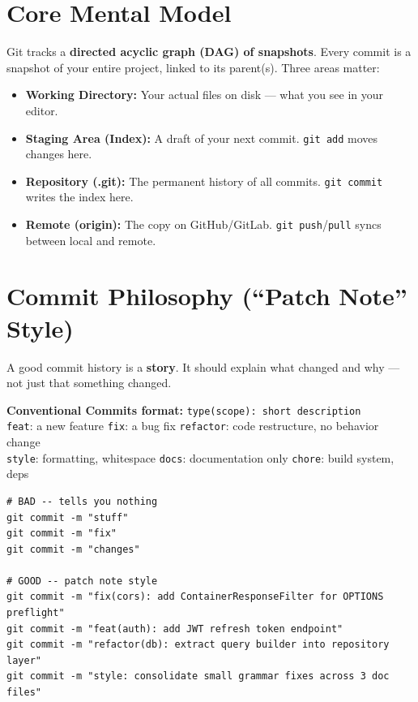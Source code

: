 \documentclass[11pt, letterpaper]{article}
\begin{document}
\vspace{8pt}

\section*{Core Mental Model}

Git tracks a \textbf{directed acyclic graph (DAG) of snapshots}. Every commit is a snapshot of your entire project, linked to its parent(s). Three areas matter:

\begin{itemize}[noitemsep]
  \item \textbf{Working Directory:} Your actual files on disk --- what you see in your editor.
  \item \textbf{Staging Area (Index):} A draft of your next commit. \texttt{git add} moves changes here.
  \item \textbf{Repository (.git):} The permanent history of all commits. \texttt{git commit} writes the index here.
  \item \textbf{Remote (origin):} The copy on GitHub/GitLab. \texttt{git push}/\texttt{pull} syncs between local and remote.
\end{itemize}

\section*{Commit Philosophy (``Patch Note'' Style)}

A good commit history is a \textbf{story}. It should explain what changed and why --- not just that something changed.

\begin{tcolorbox}[colback=part7bg, colframe=sectiongrey, arc=3pt, boxrule=1pt]
\textbf{Conventional Commits format:} \quad \texttt{type(scope): short description}\\[4pt]
\texttt{feat}: a new feature \quad
\texttt{fix}: a bug fix \quad
\texttt{refactor}: code restructure, no behavior change\\
\texttt{style}: formatting, whitespace \quad
\texttt{docs}: documentation only \quad
\texttt{chore}: build system, deps
\end{tcolorbox}

\begin{lstlisting}[style=gitlog, caption={Good vs.\ bad commits}]
# BAD -- tells you nothing
git commit -m "stuff"
git commit -m "fix"
git commit -m "changes"

# GOOD -- patch note style
git commit -m "fix(cors): add ContainerResponseFilter for OPTIONS preflight"
git commit -m "feat(auth): add JWT refresh token endpoint"
git commit -m "refactor(db): extract query builder into repository layer"
git commit -m "style: consolidate small grammar fixes across 3 doc files"
\end{lstlisting}
\end{document}
